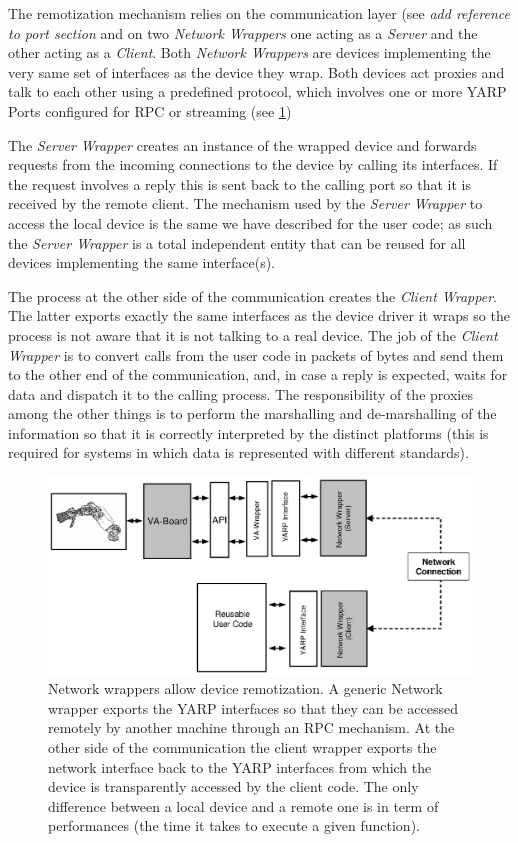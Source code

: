 The remotization mechanism relies on the communication layer (see \emph{add 
reference to port section} and on two \emph{Network Wrappers} one acting as a 
\emph{Server} and the other acting as a \emph{Client}. Both \emph{Network Wrappers} 
are devices implementing the very same set of interfaces as the device they wrap. 
Both devices act proxies and talk to each other using a predefined 
protocol, which involves one or more YARP Ports configured for RPC or streaming
(see \ref{fig:devices3})

The \emph{Server Wrapper} creates an instance of the wrapped device and forwards 
requests from the incoming connections to the device by calling its interfaces. 
If the request involves a reply this is sent back to the calling port so that it 
is received by the remote client. The mechanism used by the \emph{Server Wrapper} 
to access the local device is the same we have described for the user code; as 
such the \emph{Server Wrapper} is a total independent entity that can be reused 
for all devices implementing the same interface(s). 

The process at the other side of the communication creates the 
\emph{Client Wrapper}. The latter exports exactly the same interfaces as the 
device driver it wraps so the process is not aware that it is not talking to 
a real device. The job of the \emph{Client Wrapper} is to convert calls from 
the user code in packets of bytes and send them to the other end of the 
communication, and, in case a reply is expected, waits for data and dispatch 
it to the calling process. The responsibility of the proxies among the other 
things is to perform the marshalling and de-marshalling of the information 
so that it is correctly interpreted by the distinct platforms (this is 
required for systems in which data is represented with different standards).

\begin{figure}[tbp]
\centerline{
\includegraphics[width=24cm]{fig-devices3.eps}
}
\caption{Network wrappers allow device remotization. A generic Network 
wrapper exports the YARP interfaces so that they can be accessed remotely 
by another machine through an RPC mechanism. At the other side of the 
communication the client wrapper exports the network interface back 
to the YARP interfaces from which the device is transparently accessed 
by the client code. The only difference between a local device and a 
remote one is in term of performances (the time it takes to execute 
a given function).
}\label{fig:devices3}
\end{figure}

